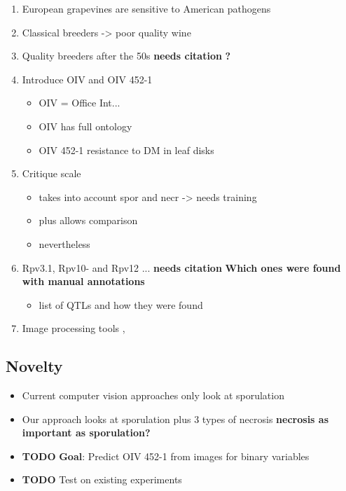 \documentclass[english]{article}
\begin{document}
\begin{enumerate}
	\item European grapevines are sensitive to American pathogens~\parencite*{fontaineEuropeBridgeheadWorldwide2021}
	\item Classical breeders -> poor quality wine
	\item Quality breeders after the 50s \textbf{needs citation} \textbf{?}
	\item Introduce OIV and OIV 452-1
        \begin{itemize}
            \item OIV = Office Int...
            \item OIV has full ontology
            \item OIV 452-1 resistance to DM in leaf disks
        \end{itemize}
	\item Critique scale \parencite{possamaiPhenotypingQTLIdentification2022}
        \begin{itemize}
            \item takes into account spor and necr -> needs training
            \item plus allows comparison
            \item nevertheless \parencite{possamaiPhenotypingQTLIdentification2022}
        \end{itemize}
	\item Rpv3.1, Rpv10- and Rpv12 ... \textbf{needs citation} \textbf{Which ones were found with manual annotations}
        \begin{itemize}
            \item  \parencite{possamaiPhenotypingQTLIdentification2022} list of QTLs and how they were found
        \end{itemize}
	\item Image processing tools \parencite{hernandezAssessmentDownyMildew2022}, \parencite{zendlerHighthroughputPhenotypingLeaf2021}
\end{enumerate}

\subsection{Novelty}

\begin{itemize}
	\item Current computer vision approaches only look at sporulation
	\item Our approach looks at sporulation plus 3 types of necrosis \textbf{necrosis as important as sporulation?}
	\item \textbf{TODO} \textbf{Goal}: Predict OIV 452-1 from images for binary variables
	\item \textbf{TODO} Test on existing experiments
\end{itemize}
\end{document}
